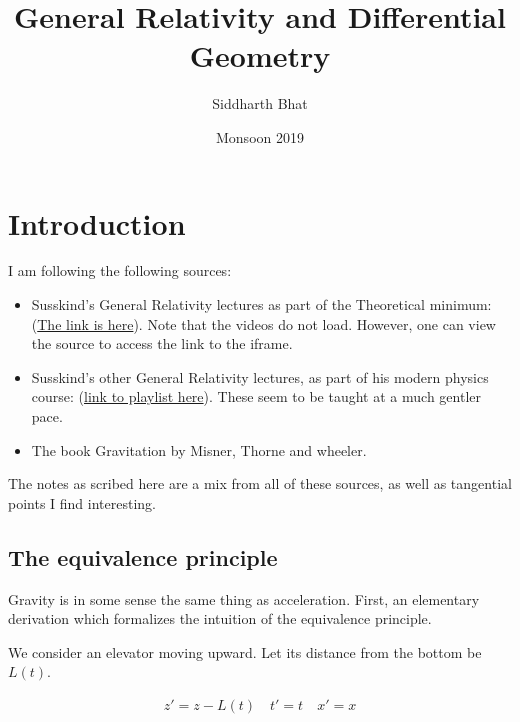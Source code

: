 \documentclass[11pt]{book}
\title{General Relativity and Differential Geometry}
\author{Siddharth Bhat}
\date{Monsoon 2019}
\begin{document}
\maketitle
\tableofcontents

\chapter{Introduction}

I am following the following sources:

\begin{itemize}
    \item Susskind's General Relativity lectures as part of the Theoretical
        minimum: (\href{https://theoreticalminimum.com/courses/general-relativity/}{The link is here}).
        Note that the videos do not load. However, one can view the source to access the link
        to the iframe.
    \item Susskind's other General Relativity lectures, as part of his modern
        physics course: (\href{https://www.youtube.com/watch?v=hbmf0bB38h0&list=PL6C8BDEEBA6BDC78D}{link to playlist here}).
        These seem to be taught at a much gentler pace.
    \item The book Gravitation by Misner, Thorne and wheeler.
\end{itemize}

The notes as scribed here are a mix from all of these sources, as well
as tangential points I find interesting.

\section{The equivalence principle}

Gravity is in some sense the same thing as acceleration. First, an elementary
derivation which formalizes the intuition of the equivalence principle.

We consider an elevator moving upward. Let its distance from the bottom be $L(t)$.

\begin{align*}
    z' = z - L(t) \quad t' = t \quad x' = x
\end{align*}


\end{document}
